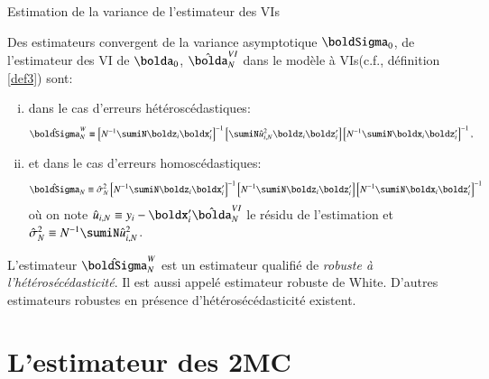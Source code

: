 \begin{frame}[allowframebreaks]{Estimation de la variance de l'estimateur des VIs}
\begin{itemize}
    \begin{propriete}
        Des estimateurs convergent de la variance asymptotique $\boldSigma_0$, de l’estimateur des VI de $\bolda_0$, 
        $\hat{\bolda}_N^{VI}$ dans le modèle à VIs(c.f., définition \ref{def3})  sont:
        \begin{enumerate}[(i)]
            \item dans le cas d'erreurs hétéroscédastiques:
            \begin{align*}
                \hat{\boldSigma}_N^{W}&\equiv  \left[ N^{-1}\sumiN\boldz_i\boldx_i^\prime \right]^{-1} 
                \left[ \sumiN \hat{u}_{i, N}^2\boldz_i\boldz_i^\prime \right]
                 \left[ N^{-1}\sumiN\boldx_i\boldz_i^\prime \right]^{-1},
            \end{align*}
            \item et dans le cas d'erreurs homoscédastiques:
            \begin{align*}
                \hat{\boldSigma}_N\equiv \hat{\sigma}^2_N
                \left[ N^{-1}\sumiN\boldz_i\boldx_i^\prime \right]^{-1} 
               \left[ N^{-1}\sumiN\boldz_i\boldz_i^\prime\right]
               \left[ N^{-1}\sumiN\boldx_i\boldz_i^\prime \right]^{-1} 
            \end{align*}
            où on note $\hat{u}_{i, N} \equiv y_i-\boldx_i^\prime \hat{\bolda}_N^{VI}$ 
            le résidu de l'estimation et $\hat{\sigma}^2_N\equiv N^{-1} \sumiN \hat{u}_{i, N}^2$.
        \end{enumerate}

    \end{propriete}
    \begin{remark_fr}
        L'estimateur $\hat{\boldSigma}_N^{W}$ est un estimateur 
        qualifié de \emph{robuste à l'hétérosécédasticité}. Il est aussi appelé 
        estimateur robuste de White. D'autres estimateurs robustes en présence d'hétérosécédasticité
        existent.
    \end{remark_fr}
\end{itemize}
\end{frame}

\section{L’estimateur des 2MC}
\frame{\sectionpage}

